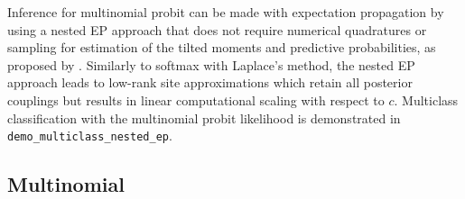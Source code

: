 \documentclass[twoside,11pt]{article}
\DeclareMathOperator{\f}{\mathbf{f}}
\newcommand{\pkg}[1]{{\fontseries{b}\selectfont #1}}
\newcommand{\code}[1]{{\normalfont\texttt{#1}}}
\begin{document}
Inference for multinomial probit can be made with expectation
propagation by using a nested EP approach that does not require
numerical quadratures or sampling for estimation of the tilted moments
and predictive probabilities, as proposed by \citet{Riihimaki+Jylanki+Vehtari:2013}.
%
Similarly to softmax with Laplace's method, the nested EP approach
leads to low-rank site approximations which retain all posterior
couplings but results in linear computational scaling with respect to
$c$.
%
Multiclass classification with the multinomial probit likelihood is
demonstrated in \code{demo\_multiclass\_nested\_ep}.

\subsection{Multinomial}
\end{document}

